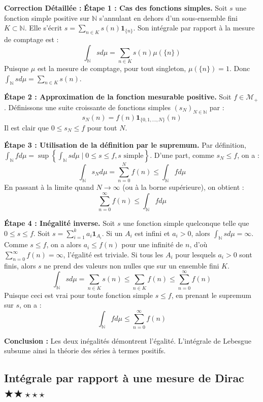 \documentclass[11pt,a4paper]{article}
\begin{document}
\textbf{Correction D\'etaill\'ee :}
\textbf{Étape 1 : Cas des fonctions simples.}
Soit $s$ une fonction simple positive sur $\mathbb{N}$ s'annulant en dehors d'un sous-ensemble fini $K \subset \mathbb{N}$.
Elle s'\'ecrit $s = \sum_{n \in K} s(n) \mathbf{1}_{\{n\}}$.
Son int\'egrale par rapport \`a la mesure de comptage est :
$$\int_{\mathbb{N}} s d\mu = \sum_{n \in K} s(n) \mu(\{n\})$$
Puisque $\mu$ est la mesure de comptage, pour tout singleton, $\mu(\{n\}) = 1$.
Donc $\int_{\mathbb{N}} s d\mu = \sum_{n \in K} s(n)$.

\textbf{Étape 2 : Approximation de la fonction mesurable positive.}
Soit $f \in \mathcal{M}_+$. D\'efinissons une suite croissante de fonctions simples $(s_N)_{N \in \mathbb{N}}$ par :
$$s_N(n) = f(n) \mathbf{1}_{\{0, 1, \dots, N\}}(n)$$
Il est clair que $0 \le s_N \le f$ pour tout $N$.

\textbf{Étape 3 : Utilisation de la d\'efinition par le supremum.}
Par d\'efinition, $\int_{\mathbb{N}} f d\mu = \sup \left\{ \int_{\mathbb{N}} s d\mu \mid 0 \le s \le f, s \text{ simple} \right\}$.
D'une part, comme $s_N \le f$, on a :
$$\int_{\mathbb{N}} s_N d\mu = \sum_{n=0}^N f(n) \le \int_{\mathbb{N}} f d\mu$$
En passant \`a la limite quand $N \to \infty$ (ou \`a la borne sup\'erieure), on obtient :
$$\sum_{n=0}^\infty f(n) \le \int_{\mathbb{N}} f d\mu$$

\textbf{Étape 4 : In\'egalit\'e inverse.}
Soit $s$ une fonction simple quelconque telle que $0 \le s \le f$.
Soit $s = \sum_{i=1}^k a_i \mathbf{1}_{A_i}$.
Si un $A_i$ est infini et $a_i > 0$, alors $\int_{\mathbb{N}} s d\mu = \infty$. Comme $s \le f$, on a alors $a_i \le f(n)$ pour une infinit\'e de $n$, d'où $\sum_{n=0}^\infty f(n) = \infty$, l'\'egalit\'e est triviale.
Si tous les $A_i$ pour lesquels $a_i > 0$ sont finis, alors $s$ ne prend des valeurs non nulles que sur un ensemble fini $K$.
$$\int_{\mathbb{N}} s d\mu = \sum_{n \in K} s(n) \le \sum_{n \in K} f(n) \le \sum_{n=0}^\infty f(n)$$
Puisque ceci est vrai pour toute fonction simple $s \le f$, en prenant le supremum sur $s$, on a :
$$\int_{\mathbb{N}} f d\mu \le \sum_{n=0}^\infty f(n)$$

\textbf{Conclusion :}
Les deux in\'egalit\'es d\'emontrent l'\'egalit\'e. L'int\'egrale de Lebesgue subsume ainsi la th\'eorie des s\'eries \`a termes positifs.


\subsection*{Int\'egrale par rapport \`a une mesure de Dirac \quad $\bigstar\bigstar\star\star\star$}
\end{document}
